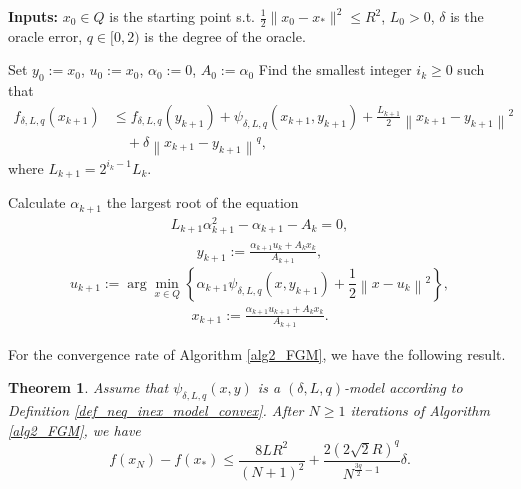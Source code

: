 \documentclass[11pt]{amsart}
\newtheorem{theorem}{Theorem}[section]
\theoremstyle{definition}
\numberwithin{equation}{section}
\begin{document}
\begin{algorithm}
\caption{{Adaptive inexact fast  gradient method with $(\delta, L, q)$-model}. }
\label{alg2_FGM}
\textbf{Inputs:} $x_0 \in Q$ is the starting point s.t. $\frac{1}{2}\|x_0 - x_*\|^2 \leq R^2$, $ L_{0} > 0$, $\delta $ is the oracle error, $q \in [0, 2)$ is the degree of the oracle. 
\hspace*{\algorithmicindent}
\begin{algorithmic}[1]
\STATE Set
$y_0 := x_0$, $u_0 := x_0$, $\alpha_0 := 0$, $A_0 := \alpha_0$
\STATE Find the smallest integer $i_k \geq 0$ such that
\begin{align}\label{exitLDL_strong}
    f_{\delta, L, q}(x_{k+1}) & \leq f_{\delta, L, q}(y_{k+1}) + \psi_{\delta, L, q}(x_{k+1}, y_{k+1}) +\frac{L_{k+1}}{2} \left\|x_{k+1} - y_{k+1}\right\|^2 
    \\& \quad + \delta\left \|x_{k+1} - y_{k+1}\right\|^q, \nonumber
\end{align}
where $L_{k+1} = 2^{i_k-1}L_k$. 

Calculate $\alpha_{k+1}$ the largest root  of the equation
\begin{gather*}\label{alpha_def_strong}
    L_{k+1}\alpha^2_{k+1}-  \alpha_{k+1} -A_k= 0,
\end{gather*}
\begin{gather}
    y_{k+1} := \frac{\alpha_{k+1}u_k + A_k x_k}{A_{k+1}}, \label{eqymir2DL_strong}
\end{gather}
\begin{equation}\label{equmir2DL_strong}
    u_{k+1} := \arg\min_{x \in Q}\left\{ \alpha_{k+1}\psi_{\delta,L, q}(x, y_{k+1}) + \frac{1}{2}\left \|x - u_k\right\|^2 \right\} , 
\end{equation}
\begin{gather}\label{eqxmir2DL_strong}
    x_{k+1} := \frac{\alpha_{k+1}u_{k+1} + A_k x_k}{A_{k+1}}. 
\end{gather}
\ENDFOR
\end{algorithmic}
\end{algorithm}

For the convergence rate of Algorithm \ref{alg2_FGM}, we have the following result. 

\begin{theorem}\label{theo_Adaptive_FGM}
Assume that $\psi_{\delta,L,q}(x,y)$ is a $(\delta, L, q)$-model according to Definition \ref{def_neq_inex_model_convex}. After $N \geq 1$ iterations of Algorithm \ref{alg2_FGM}, we have
\begin{equation}\label{rate_FGM}
    f(x_N) - f(x_*) \leq \frac{8L R^2}{(N+1)^2} + \frac{2 \left(2\sqrt{2} R\right)^q}{N^{\frac{3q}{2} - 1}} \delta. 
\end{equation}
\end{theorem}
\end{document}
